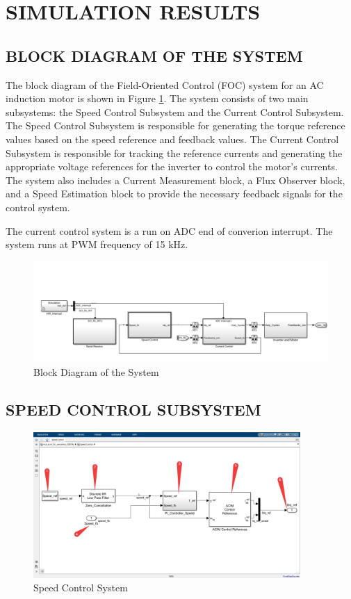 \section{SIMULATION RESULTS}

\subsection{BLOCK DIAGRAM OF THE SYSTEM}



The block diagram of the Field-Oriented Control (FOC) system for an AC induction motor is shown in Figure \ref{fig:block_diagram}. The system consists of two main subsystems: the Speed Control Subsystem and the Current Control Subsystem. The Speed Control Subsystem is responsible for generating the torque reference values based on the speed reference and feedback values. The Current Control Subsystem is responsible for tracking the reference currents and generating the appropriate voltage references for the inverter to control the motor's currents. The system also includes a Current Measurement block, a Flux Observer block, and a Speed Estimation block to provide the necessary feedback signals for the control system.


The current control system is a run on ADC end of converion interrupt. The system runs at PWM frequency of 15 kHz.

\begin{figure}[H]
	\centering
	\includegraphics[width=6in]{sections/section3/images/simulation/blockDia.png}
	\caption{Block Diagram of the System}
	\label{fig:block_diagram}
\end{figure}


\subsection{SPEED CONTROL SUBSYSTEM}

\begin{figure}[H]
	\centering
	\includegraphics[width=4in]{sections/section3/images/simulation/speedControl/speedController.png}
	\caption{Speed Control System}
	\label{fig:speed_control_system}
\end{figure}


